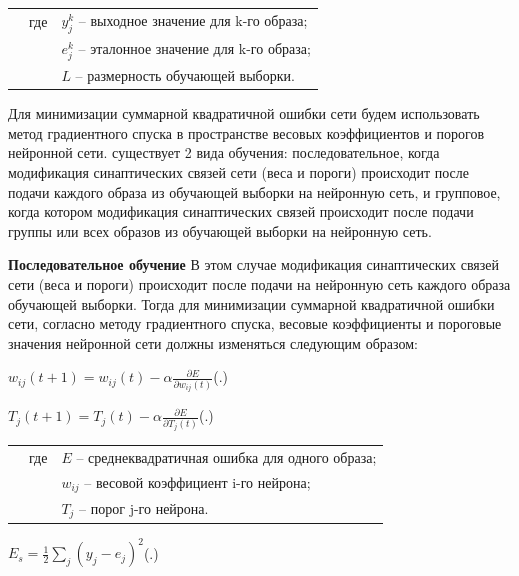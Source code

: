 	\begin{tabular}{p{}p{}p{}}
		& где  & $y_{j}^{k}$ {--} выходное значение для k-го образа; \\
		&      & $e_{j}^{k}$ {--} эталонное значение для k-го образа; \\
		&      & $L$ {--} размерность обучающей выборки. \\
	\end{tabular}
	
	\par \redline Для минимизации суммарной квадратичной ошибки сети будем использовать метод градиентного спуска в пространстве весовых коэффициентов и порогов нейронной сети. существует 2 вида обучения: последовательное, когда модификация
	синаптических связей сети (веса и пороги) происходит после подачи
	каждого образа из обучающей выборки на нейронную сеть, и групповое, когда котором модификация синаптических связей происходит после подачи группы или всех образов из
	обучающей выборки на нейронную сеть. 
	
	\par \redline \textbf{Последовательное обучение } В этом случае модификация синаптических связей сети (веса и пороги) происходит после подачи на нейронную сеть каждого образа обучающей выборки. Тогда для минимизации суммарной квадратичной
	ошибки сети, согласно методу градиентного спуска, весовые коэффициенты и пороговые значения нейронной сети должны изменяться следующим образом:
	
	\formulaspace \par \redline 
	$w_{ij}(t+1) = w_{ij}(t) - \alpha \frac{\partial E}{\partial w_{ij}(t)} $\hfill (\thechaptercntr .\theformulacntr) \redline
	\formulaspace \addtocounter{formulacntr}{1}
	
	\formulaspace \par \redline 
	$T_{j}(t+1) = T_{j}(t) - \alpha \frac{\partial E}{\partial T_{j}(t)} $\hfill (\thechaptercntr .\theformulacntr) \redline
	\formulaspace \addtocounter{formulacntr}{1}
	
	\begin{tabular}{p{}p{}p{}}
		& где  & $E$ {--} среднеквадратичная ошибка для одного образа; \\
		&      &  $w_{ij}$ {--} весовой коэффициент i-го нейрона; \\
		&      & $T_{j}$ {--} порог j-го нейрона. \\
	\end{tabular}
	
	\formulaspace \par \redline 
	$E_{s} = \frac{1}{2} \sum \limits _{j}^{} (y_{j} - e_{j})^{2} $\hfill (\thechaptercntr .\theformulacntr) \redline
	\formulaspace \addtocounter{formulacntr}{1}
	
